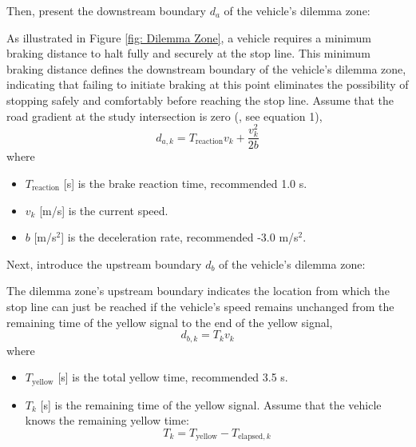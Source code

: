 Then, present the downstream boundary $d_a$ of the vehicle's dilemma zone:

As illustrated in Figure \ref{fig: Dilemma Zone}, a vehicle requires a minimum braking distance to halt fully and securely at the stop line. This minimum braking distance defines the downstream boundary of the vehicle's dilemma zone, indicating that failing to initiate braking at this point eliminates the possibility of stopping safely and comfortably before reaching the stop line. Assume that the road gradient at the study intersection is zero (\textcite{gates2007analysis}, see equation 1),
\begin{equation}\label{downstream boundary}
    d_{a, k} = T_{\text{reaction}}v_k + \frac{v_k^2}{2b}
\end{equation}
where
\begin{itemize}
    \item $T_{\text{reaction}}$ [s] is the brake reaction time, recommended 1.0 s.
    \item $v_k$ [m/s] is the current speed.
    \item $b$ [m/s$^2$] is the deceleration rate, recommended -3.0 m/s$^2$.
\end{itemize}


Next, introduce the upstream boundary $d_b$ of the vehicle's dilemma zone:

The dilemma zone's upstream boundary indicates the location from which the stop line can just be reached if the vehicle's speed remains unchanged from the remaining time of the yellow signal to the end of the yellow signal,
\begin{equation}\label{upstream boundary}
    d_{b, k} = T_kv_k 
\end{equation}
where
\begin{itemize}
    \item $T_{\text{yellow}}$ [s] is the total yellow time, recommended 3.5 s.
    \item $T_k$ [s] is the remaining time of the yellow signal. Assume that the vehicle knows the remaining yellow time:
    \begin{equation}\label{remaining yellow time}
        T_k = T_{\text{yellow}} - T_{\text{elapsed}, k}
    \end{equation}
\end{itemize}

